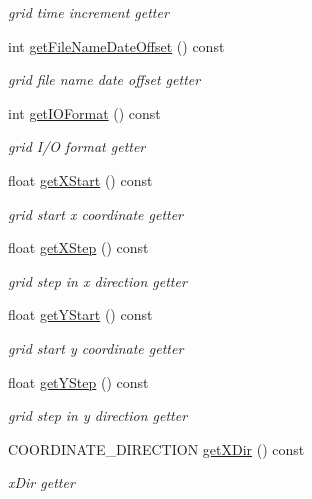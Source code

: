 \begin{DoxyCompactItemize}
\begin{DoxyCompactList}\small\item\em grid time increment getter \end{DoxyCompactList}\item 
int \hyperlink{classfwi_1_1grid_1_1Grid_ac8b97200a77c83bbed7c441fe8414212}{get\-File\-Name\-Date\-Offset} () const 
\begin{DoxyCompactList}\small\item\em grid file name date offset getter \end{DoxyCompactList}\item 
int \hyperlink{classfwi_1_1grid_1_1Grid_af6127c6adeb24967516c1d9e0af1a4c6}{get\-I\-O\-Format} () const 
\begin{DoxyCompactList}\small\item\em grid I/\-O format getter \end{DoxyCompactList}\item 
float \hyperlink{classfwi_1_1grid_1_1Grid_ae2feb145847b2504ca2474a9e3e33945}{get\-X\-Start} () const 
\begin{DoxyCompactList}\small\item\em grid start x coordinate getter \end{DoxyCompactList}\item 
float \hyperlink{classfwi_1_1grid_1_1Grid_ac2986f115fadf2ef16cf0b9e61114baf}{get\-X\-Step} () const 
\begin{DoxyCompactList}\small\item\em grid step in x direction getter \end{DoxyCompactList}\item 
float \hyperlink{classfwi_1_1grid_1_1Grid_a5e41f9d7886b318044b1de323d075d54}{get\-Y\-Start} () const 
\begin{DoxyCompactList}\small\item\em grid start y coordinate getter \end{DoxyCompactList}\item 
float \hyperlink{classfwi_1_1grid_1_1Grid_aae81a8e8fddf00750337a86bc6940337}{get\-Y\-Step} () const 
\begin{DoxyCompactList}\small\item\em grid step in y direction getter \end{DoxyCompactList}\item 
C\-O\-O\-R\-D\-I\-N\-A\-T\-E\-\_\-\-D\-I\-R\-E\-C\-T\-I\-O\-N \hyperlink{classfwi_1_1grid_1_1Grid_a60d11b4f03f3ed4ef4349d25897486d7}{get\-X\-Dir} () const 
\begin{DoxyCompactList}\small\item\em x\-Dir getter \end{DoxyCompactList}\item 

\end{DoxyCompactItemize}
